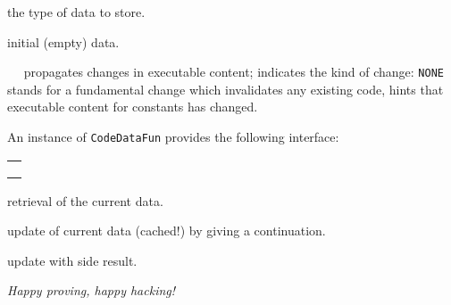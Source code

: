 \begin{isabellebody}
\begin{isamarkuptext}
  \begin{description}

  \item {} the type of data to store.

  \item {} initial (empty) data.

  \item {}~~ propagates changes in executable content;
     indicates the kind
    of change: \verb|NONE| stands for a fundamental change
    which invalidates any existing code, 
    hints that executable content for constants 
    has changed.

  \end{description}

  \noindent An instance of \verb|CodeDataFun| provides the following
  interface:

  \medskip
  \begin{tabular}{l}
  \isa{get{\isacharcolon}\ theory\ {\isasymrightarrow}\ T} \\
  \isa{change{\isacharcolon}\ theory\ {\isasymrightarrow}\ {\isacharparenleft}T\ {\isasymrightarrow}\ T{\isacharparenright}\ {\isasymrightarrow}\ T} \\
  \isa{change{\isacharunderscore}yield{\isacharcolon}\ theory\ {\isasymrightarrow}\ {\isacharparenleft}T\ {\isasymrightarrow}\ {\isacharprime}a\ {\isacharasterisk}\ T{\isacharparenright}\ {\isasymrightarrow}\ {\isacharprime}a\ {\isacharasterisk}\ T}
  \end{tabular}

  \begin{description}

  \item {} retrieval of the current data.

  \item {} update of current data (cached!)
    by giving a continuation.

  \item {} update with side result.

  \end{description}%
\end{isamarkuptext}%
\isamarkuptrue%
%
\begin{isamarkuptext}%
\bigskip

  \emph{Happy proving, happy hacking!}%
\end{isamarkuptext}%
\isamarkuptrue%
%
\isadelimtheory
%
\endisadelimtheory
%
\isatagtheory
{}\isamarkupfalse%
%
\endisatagtheory
{\isafoldtheory}%
%
\isadelimtheory
%
\endisadelimtheory
\isanewline
\end{isabellebody}%
